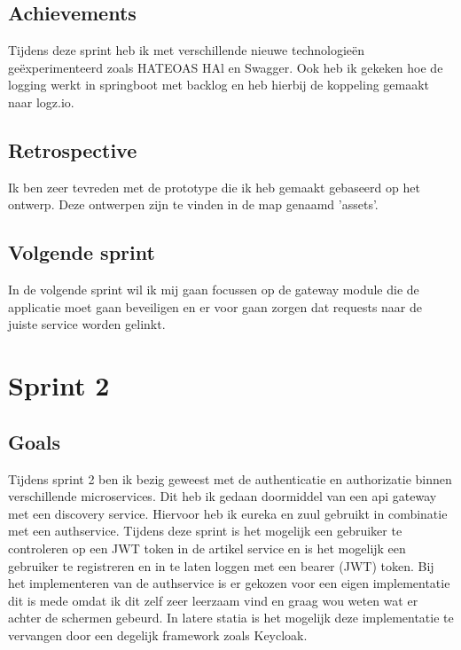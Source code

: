 \documentclass[11pt, twoside]{report}
\begin{document}
    \subsection{Achievements}\label{subsec:achievements-1}
    Tijdens deze sprint heb ik met verschillende nieuwe technologieën geëxperimenteerd zoals HATEOAS HAl en Swagger.
    Ook heb ik gekeken hoe de logging werkt in springboot met backlog en heb hierbij de koppeling gemaakt naar logz.io.

    \subsection{Retrospective}\label{subsec:retrospective-1}
    Ik ben zeer tevreden met de prototype die ik heb gemaakt gebaseerd op het ontwerp.
    Deze ontwerpen zijn te vinden in de map genaamd 'assets'.

    \subsection{Volgende sprint}\label{subsec:volgende-sprint-1}
    In de volgende sprint wil ik mij gaan focussen op de gateway module die de applicatie moet gaan beveiligen en er
    voor gaan zorgen dat requests naar de juiste service worden gelinkt.


    \newpage
    \section{Sprint 2}
    \label{sec:sprint-2}

    \subsection{Goals}\label{subsec:goals=2}
    Tijdens sprint 2 ben ik bezig geweest met de authenticatie en authorizatie binnen verschillende microservices.
    Dit heb ik gedaan doormiddel van een api gateway met een discovery service.
    Hiervoor heb ik eureka en zuul gebruikt in combinatie met een authservice.
    Tijdens deze sprint is het mogelijk een gebruiker te controleren op een JWT token in de artikel service en
    is het mogelijk een gebruiker te registreren en in te laten loggen met een bearer (JWT) token.
    Bij het implementeren van de authservice is er gekozen voor een eigen implementatie dit is mede omdat ik dit zelf
    zeer leerzaam vind en graag wou weten wat er achter de schermen gebeurd.
    In latere statia is het mogelijk deze implementatie te vervangen door een degelijk framework zoals Keycloak.
\end{document}
